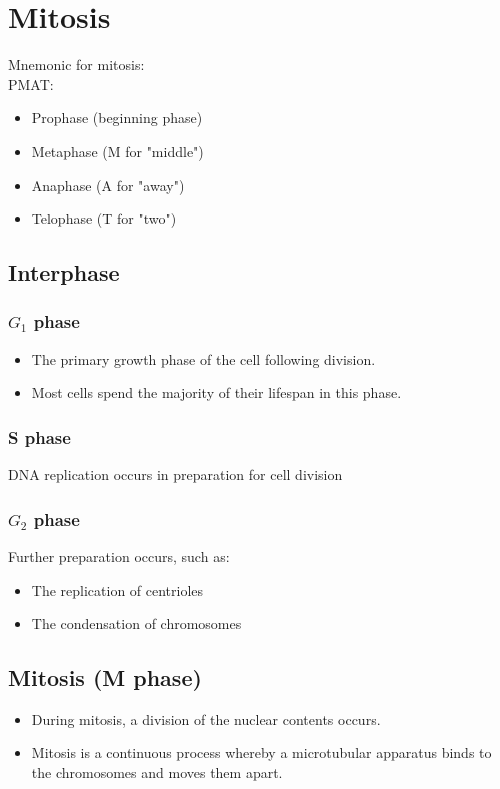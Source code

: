\documentclass[11pt]{article}
\begin{document}
\newpage

\section{Mitosis}
\label{sec:orgd0bdee6}
Mnemonic for mitosis:
\\[0pt]

PMAT:
\begin{itemize}
\item Prophase (beginning phase)
\item Metaphase (M for "middle")
\item Anaphase (A for "away")
\item Telophase (T for "two")
\end{itemize}

\subsection{Interphase}
\label{sec:orgcdf4f3a}

\subsubsection{\(G_1\) phase}
\label{sec:org117811f}
\begin{itemize}
\item The primary growth phase of the cell following division.
\item Most cells spend the majority of their lifespan in this phase.
\end{itemize}

\subsubsection{S phase}
\label{sec:org734352f}
DNA replication occurs in preparation for cell division

\subsubsection{\(G_2\) phase}
\label{sec:org203487f}
Further preparation occurs, such as:
\begin{itemize}
\item The replication of centrioles
\item The condensation of chromosomes
\end{itemize}

\subsection{Mitosis (M phase)}
\label{sec:org9b0ec46}
\begin{itemize}
\item During mitosis, a division of the nuclear contents occurs.
\item Mitosis is a continuous process whereby a microtubular apparatus binds to the chromosomes and moves them apart.
\end{itemize}
\end{document}
